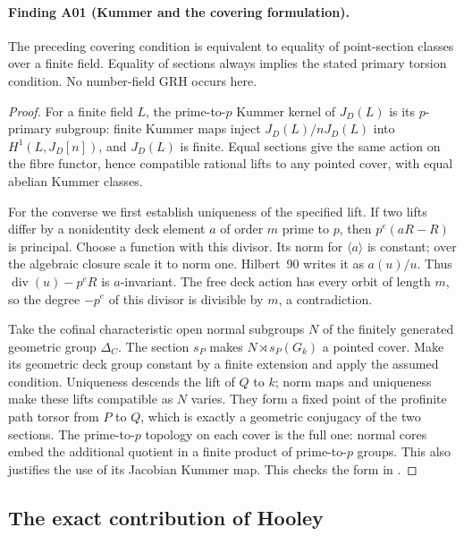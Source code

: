 \documentclass[11pt,a4paper]{article}
\begin{document}
\paragraph{Finding A01 (Kummer and the covering formulation).}
The preceding covering condition is equivalent to equality of point-section
classes over a finite field. Equality of sections always implies the
stated primary torsion condition. No number-field GRH occurs here.

\begin{proof}
For a finite field $L$, the prime-to-$p$ Kummer kernel of $J_D(L)$ is its
$p$-primary subgroup: finite Kummer maps inject $J_D(L)/nJ_D(L)$ into
$H^1(L,J_D[n])$, and $J_D(L)$ is finite. Equal sections give the same
action on the fibre functor, hence compatible rational lifts to any
pointed cover, with equal abelian Kummer classes.

For the converse we first establish uniqueness of the specified lift.
If two lifts differ by a nonidentity deck element $a$ of order $m$ prime
to $p$, then $p^e(aR-R)$ is principal. Choose a function with this
divisor. Its norm for $\langle a\rangle$ is constant; over the algebraic
closure scale it to norm one. Hilbert~90 writes it as $a(u)/u$.
Thus $\operatorname{div}(u)-p^eR$ is $a$-invariant. The free deck action
has every orbit of length $m$, so the degree $-p^e$ of this divisor is
divisible by $m$, a contradiction.

Take the cofinal characteristic open normal subgroups $N$ of the finitely
generated geometric group $\Delta_C$. The section $s_P$ makes
$N\rtimes s_P(G_k)$ a pointed cover. Make its geometric deck group
constant by a finite extension and apply the assumed condition.
Uniqueness descends the lift of $Q$ to $k$; norm maps and uniqueness
make these lifts compatible as $N$ varies. They form a fixed point of
the profinite path torsor from $P$ to $Q$, which is exactly a geometric
conjugacy of the two sections. The prime-to-$p$ topology on each cover
is the full one: normal cores embed the additional quotient in a finite
product of prime-to-$p$ groups. This also justifies the use of its
Jacobian Kummer map. This checks the form in \cite[A.31]{A1run}.
\end{proof}

\subsection{The exact contribution of Hooley}
\end{document}
